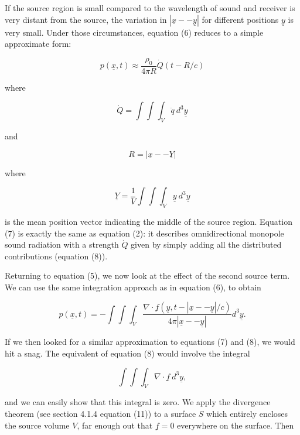 
  If the source region is small compared to the wavelength of sound and 
  receiver is very distant from the source, the variation in $|\underline{x} -- 
  \underline{y}|$ for different positions $\underline{y}$ is very small. Under 
  those circumstances, equation (6) reduces to a simple approximate form: 

  $$p(\underline{x},t) \approx \dfrac{\rho_0}{4 \pi R} \dot{Q}(t-R/c) \tag{7}$$ 

  where 

  $$\dot{Q}=\int \int \int_V{\dot{q} \mathrm{~} d^3 \underline{y}} \tag{8}$$ 

  and 

  $$R=|\underline{x} -- \underline{Y}| \tag{9}$$ 

  where 

  $$\underline{Y}=\dfrac{1}{V} \int \int \int_V{\underline{y} \mathrm{~} 
  d^3\underline{y}} \tag{10}$$ 

  is the mean position vector indicating the middle of the source region. 
  Equation (7) is exactly the same as equation (2): it describes 
  omnidirectional monopole sound radiation with a strength $\dot{Q}$ given by 
  simply adding all the distributed contributions (equation (8)). 

  Returning to equation (5), we now look at the effect of the second source 
  term. We can use the same integration approach as in equation (6), to obtain 

  $$p(\underline{x},t)=- \int \int \int_V{\dfrac{\nabla \cdot 
  \underline{f}(\underline{y},t-|\underline{x} -- \underline{y}|/c)}{4 \pi 
  |\underline{x} -- \underline{y}|} d^3 \underline{y}} . \tag{11}$$ 

  If we then looked for a similar approximation to equations (7) and (8), we 
  would hit a snag. The equivalent of equation (8) would involve the integral 

  $$\int \int \int_V{\nabla \cdot \underline{f} \mathrm{~}d^3 \underline{y}}, 
  \tag{12}$$ 

  and we can easily show that this integral is zero. We apply the divergence 
  theorem (see section 4.1.4 equation (11)) to a surface $S$ which entirely 
  encloses the source volume $V$, far enough out that $\underline{f}=0$ 
  everywhere on the surface. Then 

